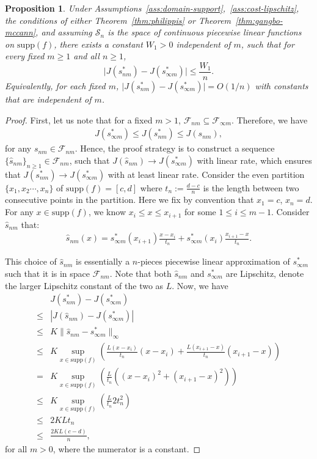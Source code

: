 \documentclass[12pt,leqno]{amsart}
\newtheorem{proposition}{Proposition}
\begin{document}
\begin{proposition}\label{prop:rate1}
 Under Assumptions~\ref{ass:domain-support},~\ref{ass:cost-lipschitz}, the conditions of either Theorem~\ref{thm:philippis} or Theorem~\ref{thm:gangbo-mccann}, and assuming $\mathcal{S}_n$ is the space of continuous piecewise linear functions on $\mathrm{supp}(f)$, there exists a constant $W_1>0$ independent of $m$, such that for every fixed $m\ge 1$ and all $n\ge 1$,
    \[
    \bigl|J(s_{nm}^*)-J(s_{\infty m}^*)\bigr|\le \frac{W_1}{n}.
    \]
    Equivalently, for each fixed $m$, $\bigl|J(s_{nm}^*)-J(s_{\infty m}^*)\bigr|=O(1/n)$ with constants that are independent of $m$.
\end{proposition}
\begin{proof}
First, let us note that for a fixed $m>1$, $\mathcal{F}_{nm}\subseteq\mathcal{F}_{\infty m}$. Therefore, we have
\begin{align*}
    J(s_{\infty m}^*)\leq J(s_{nm}^*)\leq J(s_{nm}),
\end{align*}
for any $s_{nm}\in\mathcal{F}_{n m}$. Hence, the proof strategy is to construct a sequence $\{\hat{s}_{nm}\}_{n\geq 1}\in\mathcal{F}_{nm}$, such that $J(\hat{s}_{nm})\rightarrow J(s_{\infty m}^*)$ with linear rate, which ensures that $J(s_{nm}^*)\rightarrow J(s_{\infty m}^*)$ with at least linear rate. Consider the even partition $\{x_1, x_2\cdots, x_n\}$ of $\mathrm{supp}(f)=[c,d]$ where $t_n:=\frac{d-c}{n}$ is the length between two consecutive points in the partition. Here we fix by convention that $x_1 = c$, $x_n = d$. For any $x\in \mathrm{supp}(f)$, we know $x_i\leq x\leq x_{i+1}$ for some $1\leq i\leq m-1$. Consider $\hat{s}_{nm}$ that:
\begin{align*}
    \hat{s}_{nm}(x) = s_{\infty m}^*(x_{i+1})\frac{x-x_i}{t_n} + s_{\infty m}^*(x_i)\frac{x_{i+1}-x}{t_n}.
\end{align*}

This choice of $\hat{s}_{nm}$ is essentially a $n$-pieces piecewise linear approximation of $s_{\infty m}^*$ such that it is in space $\mathcal{F}_{nm}$. Note that both $\hat{s}_{nm}$ and $s_{\infty m}^*$ are Lipschitz, denote the larger Lipschitz constant of the two as $L$.
Now, we have 
\begin{align*}
    &J(s_{nm}^*)-J(s_{\infty m}^*)\\
    \leq&|J(\hat{s}_{nm})-J(s_{\infty m}^*)|\\
    \leq& K\|\hat{s}_{nm}-s_{\infty m}^*\|_{\infty}\\
    \leq& K\sup_{x\in \mathrm{supp}(f)}\left(\frac{L(x-x_i)}{t_n}\left(x-x_i\right) + \frac{L(x_{i+1}-x)}{t_n}\left(x_{i+1}-x\right)\right)\\
    =& K\sup_{x\in \mathrm{supp}(f)}\left(\frac{L}{t_n}((x-x_i)^2+(x_{i+1}-x)^2)\right)\\
    \leq& K\sup_{x\in \mathrm{supp}(f)}\left(\frac{L}{t_n}2t_n^2\right)\\
    \leq& 2KLt_n\\
    \leq& \frac{2KL(c-d)}{n},
\end{align*}
for all $m>0$, where the numerator is a constant.
\end{proof}
\end{document}
